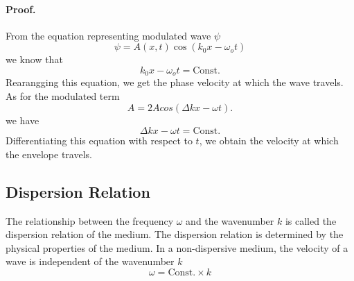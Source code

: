 \documentclass[../../../main.tex]{subfiles}
\begin{document}
\paragraph{Proof.} From the equation representing modulated wave $\psi$
\begin{equation*}
    \psi=A(x, t) \cos(k_0x - \omega_ot) 
\end{equation*}
we know that 
\begin{equation*}
    k_0x - \omega_ot=\text{Const.}
\end{equation*}
Rearangging this equation, we get the phase velocity at which the wave travels. As for the modulated term
\begin{equation*}
    A=2A cos( \Delta k x- \omega t).
\end{equation*}
we have 
\begin{equation*}
    \Delta k x- \omega t=\text{Const.}
\end{equation*}
Differentiating this equation with respect to $t$, we obtain the velocity at which the envelope travels.

\subsection*{Dispersion Relation}
The relationship between the frequency $\omega$ and the wavenumber $k$ is called the dispersion relation of the medium. The dispersion relation is determined by the physical properties of the medium. In a non-dispersive medium, the velocity of a wave is independent of the wavenumber $k$
\begin{equation*}
    \omega=\text{Const.}\times k
\end{equation*}
\end{document}
